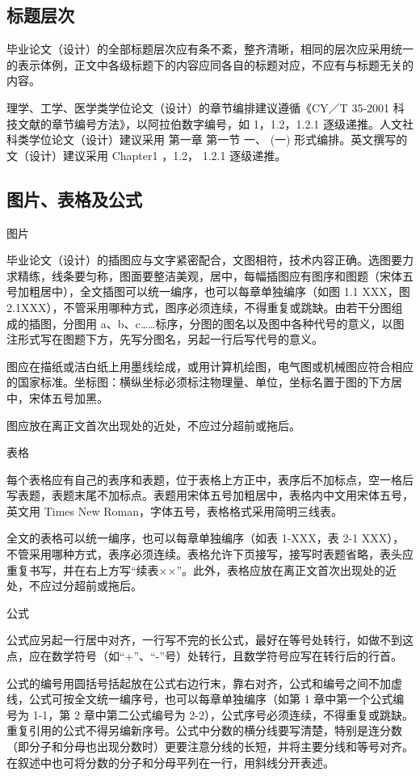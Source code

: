 \subsection{标题层次}
毕业论文（设计）的全部标题层次应有条不紊，整齐清晰，相同的层次应采用统一的表示体例，正文中各级标题下的内容应同各自的标题对应，不应有与标题无关的内容。

理学、工学、医学类学位论文（设计）的章节编排建议遵循《CY／T 35-2001 科技文献的章节编号方法》，以阿拉伯数字编号，如 1，1.2，1.2.1 逐级递推。人文社科类学位论文（设计）建议采用 第一章 第一节 一、 (一) 形式编排。英文撰写的文（设计）建议采用 Chapter1 ，1.2， 1.2.1 逐级递推。
\subsection{图片、表格及公式}
\begin{compactenum}
\item 图片

毕业论文（设计）的插图应与文字紧密配合，文图相符，技术内容正确。选图要力求精练，线条要匀称，图面要整洁美观，居中，每幅插图应有图序和图题（宋体五号加粗居中），全文插图可以统一编序，也可以每章单独编序（如图 1.1 XXX，图 2.1XXX），不管采用哪种方式，图序必须连续，不得重复或跳缺。由若干分图组成的插图，分图用 a、b、c……标序，分图的图名以及图中各种代号的意义，以图注形式写在图题下方，先写分图名，另起一行后写代号的意义。

图应在描纸或洁白纸上用墨线绘成，或用计算机绘图，电气图或机械图应符合相应的国家标准。坐标图：横纵坐标必须标注物理量、单位，坐标名置于图的下方居中，宋体五号加黑。

图应放在离正文首次出现处的近处，不应过分超前或拖后。
\item 表格

每个表格应有自己的表序和表题，位于表格上方正中，表序后不加标点，空一格后写表题，表题末尾不加标点。表题用宋体五号加粗居中，表格内中文用宋体五号，英文用 Times New Roman，字体五号，表格格式采用简明三线表。

全文的表格可以统一编序，也可以每章单独编序（如表 1-XXX，表 2-1 XXX），不管采用哪种方式，表序必须连续。表格允许下页接写，接写时表题省略，表头应重复书写，并在右上方写“续表××”。此外，表格应放在离正文首次出现处的近处，不应过分超前或拖后。

\item 公式

公式应另起一行居中对齐，一行写不完的长公式，最好在等号处转行，如做不到这点，应在数学符号（如“+”、“-”号）处转行，且数学符号应写在转行后的行首。

公式的编号用圆括号括起放在公式右边行末，靠右对齐，公式和编号之间不加虚线，公式可按全文统一编序号，也可以每章单独编序（如第 1 章中第一个公式编号为 1-1，第 2 章中第二公式编号为 2-2），公式序号必须连续，不得重复或跳缺。重复引用的公式不得另编新序号。公式中分数的横分线要写清楚，特别是连分数（即分子和分母也出现分数时）更要注意分线的长短，并将主要分线和等号对齐。在叙述中也可将分数的分子和分母平列在一行，用斜线分开表述。
\end{compactenum}
